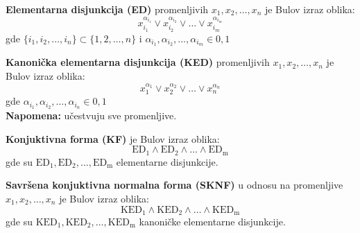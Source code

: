 	\begin{definition}
		\textbf{Elementarna disjunkcija (ED)} promenljivih $x_1, x_2,\ldots, x_n$ je Bulov izraz oblika:
		$$x_{i_1}^{\alpha_{i_1}} \lor x_{i_2}^{\alpha_{i_2}} \lor \ldots \lor x_{i_m}^{\alpha_{i_m}}$$
		gde $\{i_1, i_2, \ldots, i_n\} \subset \{1, 2, \ldots, n\}$ i  $\alpha_{i_1}, \alpha_{i_2}, \ldots, \alpha_{i_m} \in {0,1}$
	\end{definition}
	\begin{definition}
		\textbf{Kanonička elementarna disjunkcija (KED)} promenljivih $x_1, x_2,\ldots, x_n$ je Bulov izraz oblika:
		$$x_1^{\alpha_1} \lor x_2^{\alpha_2} \lor \ldots \lor x_n^{\alpha_n}$$
		gde $\alpha_{i_1}, \alpha_{i_2}, \ldots, \alpha_{i_n} \in {0,1}$\\
		\textbf{Napomena:} učestvuju sve promenljive.
	\end{definition}
	\begin{definition}
		\textbf{Konjuktivna forma (KF)} je Bulov izraz oblika:
		$$\mathrm{ED_1} \land \mathrm{ED_2} \land \ldots \land \mathrm{ED_m}$$
		gde su $\mathrm{ED_1}, \mathrm{ED_2}, \ldots, \mathrm{ED_m}$ elementarne disjunkcije. 
	\end{definition}
	\begin{definition}
		\textbf{Savršena konjuktivna normalna forma (SKNF)} u odnosu na promenljive $x_1, x_2,\ldots, x_n$ je Bulov izraz oblika:
		$$\mathrm{KED_1} \land \mathrm{KED_2} \land \ldots \land \mathrm{KED_m}$$
		gde su $\mathrm{KED_1}, \mathrm{KED_2}, \ldots, \mathrm{KED_m}$ kanoničke elementarne disjunkcije. 
	\end{definition}
	
